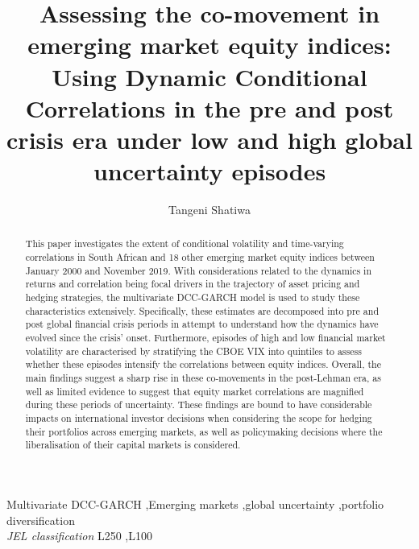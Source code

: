 \documentclass[11pt,preprint, authoryear]{elsarticle}
\numberwithin{equation}{section}
\numberwithin{figure}{section}
\numberwithin{table}{section}
\begin{document}
\begin{frontmatter}  %

\title{Assessing the co-movement in emerging market equity indices: Using
Dynamic Conditional Correlations in the pre and post crisis era under
low and high global uncertainty episodes}





\author[Add1]{Tangeni Shatiwa}





\address[Add1]{Department of Economics, Stellenbosch University, South Africa}


\begin{abstract}
\small{
This paper investigates the extent of conditional volatility and
time-varying correlations in South African and 18 other emerging market
equity indices between January 2000 and November 2019. With
considerations related to the dynamics in returns and correlation being
focal drivers in the trajectory of asset pricing and hedging strategies,
the multivariate DCC-GARCH model is used to study these characteristics
extensively. Specifically, these estimates are decomposed into pre and
post global financial crisis periods in attempt to understand how the
dynamics have evolved since the crisis' onset. Furthermore, episodes of
high and low financial market volatility are characterised by
stratifying the CBOE VIX into quintiles to assess whether these episodes
intensify the correlations between equity indices. Overall, the main
findings suggest a sharp rise in these co-movements in the post-Lehman
era, as well as limited evidence to suggest that equity market
correlations are magnified during these periods of uncertainty. These
findings are bound to have considerable impacts on international
investor decisions when considering the scope for hedging their
portfolios across emerging markets, as well as policymaking decisions
where the liberalisation of their capital markets is considered.
}
\end{abstract}

\vspace{1cm}

\begin{keyword}
\footnotesize{
Multivariate DCC-GARCH \sep Emerging markets \sep global uncertainty
\sep portfolio diversification \\ \vspace{0.3cm}
\textit{JEL classification} L250 \sep L100
}
\end{keyword}
\vspace{0.5cm}
\end{frontmatter}
\end{document}
